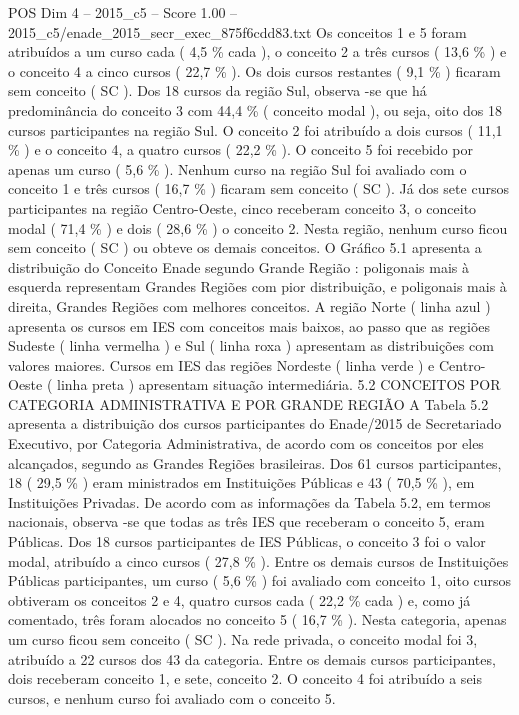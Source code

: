 \begin{textsample}{POS Dim 4 – 2015\_c5 – Score 1.00 – 2015\_c5/enade\_2015\_secr\_exec\_875f6cdd83.txt}
Os conceitos 1 e 5 foram atribuídos a um curso cada ( 4,5 \% cada ), o conceito 2 a três cursos ( 13,6 \% ) e o conceito 4 a cinco cursos ( 22,7 \% ).
Os dois cursos restantes ( 9,1 \% ) ficaram sem conceito ( SC ).
Dos 18 cursos da região Sul, observa -se que há predominância do conceito 3 com 44,4 \% ( conceito modal ), ou seja, oito dos 18 cursos participantes na região Sul.
O conceito 2 foi atribuído a dois cursos ( 11,1 \% ) e o conceito 4, a quatro cursos ( 22,2 \% ).
O conceito 5 foi recebido por apenas um curso ( 5,6 \% ).
Nenhum curso na região Sul foi avaliado com o conceito 1 e três cursos ( 16,7 \% ) ficaram sem conceito ( SC ).
Já dos sete cursos participantes na região Centro-Oeste, cinco receberam conceito 3, o conceito modal ( 71,4 \% ) e dois ( 28,6 \% ) o conceito 2.
Nesta região, nenhum curso ficou sem conceito ( SC ) ou obteve os demais conceitos.
O Gráfico 5.1 apresenta a distribuição do Conceito Enade segundo Grande Região : poligonais mais à esquerda representam Grandes Regiões com pior distribuição, e poligonais mais à direita, Grandes Regiões com melhores conceitos.
A região Norte ( linha azul ) apresenta os cursos em IES com conceitos mais baixos, ao passo que as regiões Sudeste ( linha vermelha ) e Sul ( linha roxa ) apresentam as distribuições com valores maiores.
Cursos em IES das regiões Nordeste ( linha verde ) e Centro-Oeste ( linha preta ) apresentam situação intermediária. 5.2 CONCEITOS POR CATEGORIA ADMINISTRATIVA E POR GRANDE REGIÃO A Tabela 5.2 apresenta a distribuição dos cursos participantes do Enade/2015 de Secretariado Executivo, por Categoria Administrativa, de acordo com os conceitos por eles alcançados, segundo as Grandes Regiões brasileiras.
Dos 61 cursos participantes, 18 ( 29,5 \% ) eram ministrados em Instituições Públicas e 43 ( 70,5 \% ), em Instituições Privadas.
De acordo com as informações da Tabela 5.2, em termos nacionais, observa -se que todas as três IES que receberam o conceito 5, eram Públicas.
Dos 18 cursos participantes de IES Públicas, o conceito 3 foi o valor modal, atribuído a cinco cursos ( 27,8 \% ).
Entre os demais cursos de Instituições Públicas participantes, um curso ( 5,6 \% ) foi avaliado com conceito 1, oito cursos obtiveram os conceitos 2 e 4, quatro cursos cada ( 22,2 \% cada ) e, como já comentado, três foram alocados no conceito 5 ( 16,7 \% ).
Nesta categoria, apenas um curso ficou sem conceito ( SC ).
Na rede privada, o conceito modal foi 3, atribuído a 22 cursos dos 43 da categoria.
Entre os demais cursos participantes, dois receberam conceito 1, e sete, conceito 2.
O conceito 4 foi atribuído a seis cursos, e nenhum curso foi avaliado com o conceito 5.

\end{textsample}
